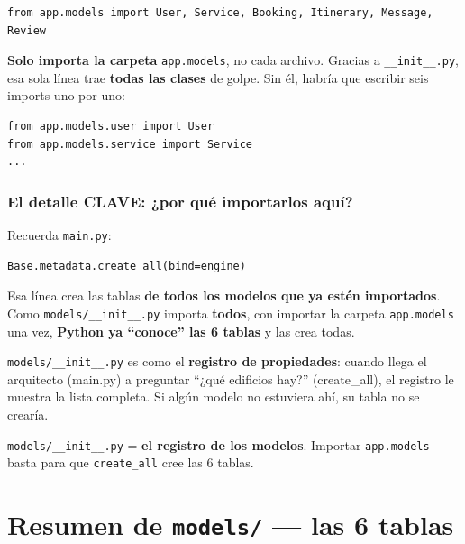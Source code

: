 \documentclass[11pt,a4paper]{article}
\begin{document}
\begin{lstlisting}
from app.models import User, Service, Booking, Itinerary, Message, Review
\end{lstlisting}

\textbf{Solo importa la carpeta} \texttt{app.models}, no cada archivo. Gracias a
\texttt{\_\_init\_\_.py}, esa sola línea trae \textbf{todas las clases} de golpe. Sin él,
habría que escribir seis imports uno por uno:

\begin{lstlisting}
from app.models.user import User
from app.models.service import Service
...
\end{lstlisting}

\subsubsection{El detalle CLAVE: ¿por qué importarlos aquí?}

Recuerda \texttt{main.py}:
\begin{lstlisting}
Base.metadata.create_all(bind=engine)
\end{lstlisting}

Esa línea crea las tablas \textbf{de todos los modelos que ya estén importados}.
Como \texttt{models/\_\_init\_\_.py} importa \textbf{todos}, con importar la carpeta
\texttt{app.models} una vez, \textbf{Python ya ``conoce'' las 6 tablas} y las crea todas.

\begin{analogia}
\texttt{models/\_\_init\_\_.py} es como el \textbf{registro de propiedades}: cuando llega el
arquitecto (main.py) a preguntar ``¿qué edificios hay?'' (create\_all), el registro le
muestra la lista completa. Si algún modelo no estuviera ahí, su tabla no se crearía.
\end{analogia}

\begin{recuadro}
\texttt{models/\_\_init\_\_.py} = \textbf{el registro de los modelos}. Importar
\texttt{app.models} basta para que \texttt{create\_all} cree las 6 tablas.
\end{recuadro}

\section{Resumen de \texttt{models/} --- las 6 tablas}
\end{document}
